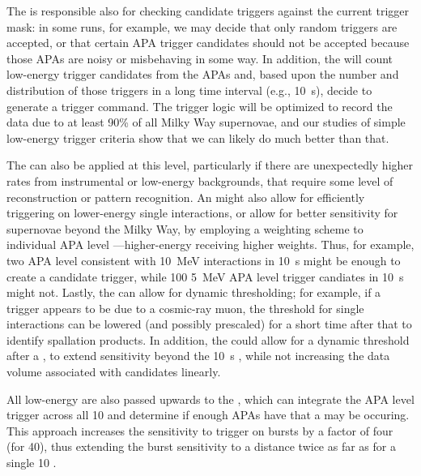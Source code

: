 The  is responsible also for checking candidate triggers
against the current  trigger mask: in some runs, for
example, we may decide that only random triggers are accepted, or that
certain APA trigger candidates should not be accepted because those
APAs are noisy or misbehaving in some way. 
In addition, the  will count low-energy trigger candidates
from the APAs and, based upon the number and distribution of those
triggers in a long time interval (e.g., \SI{10}{\s}), decide to
generate a  trigger command.
 The trigger logic will be
optimized to record the data due to at least 90\% of all Milky Way
supernovae, and our studies of simple low-energy trigger criteria show
that we can likely do much better than that.  

	
The  can also be applied at this level, particularly if
there are unexpectedly higher rates from instrumental or low-energy
backgrounds, that require some level of reconstruction or pattern
recognition. 
An  might also allow for efficiently triggering on
lower-energy single interactions, or allow for better sensitivity for
supernovae beyond the Milky Way, by employing a weighting scheme to
individual APA level ---higher-energy
 receiving higher weights. 
Thus, for example, two APA level  consistent
with \SI{10}{\MeV} interactions in \SI{10}{\s} might be enough to
create a  candidate trigger, while 100 \SI{5}{\MeV} APA
level trigger candiates in \SI{10}{\s} might not.
Lastly, the  can allow for dynamic thresholding; for
example, if a trigger appears to be due to a cosmic-ray muon, the
threshold for single interactions can be lowered (and possibly
prescaled) for a short time after that to identify spallation
products. 
In addition, the  could allow for a dynamic threshold after
a , to extend sensitivity beyond the \SI{10}{\s}
 , while not increasing the data
volume associated with  candidates linearly. 

All low-energy  are also passed upwards to the
, which can integrate the APA level trigger across all
\SI{10}{\kton}  and determine if enough APAs have
 that a  may be occuring. 
This approach increases the sensitivity to trigger on bursts by a
factor of four (for \SI{40}{\kton}), thus extending the burst
sensitivity to a distance twice as far as for a single \SI{10}{\kton}
. 

